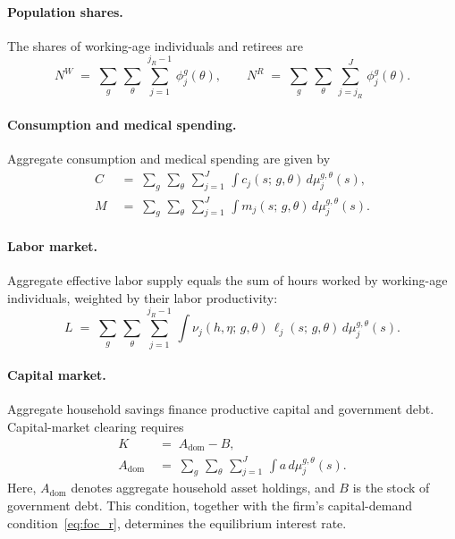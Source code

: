 \documentclass[12pt,a4paper]{article}
\begin{document}
\paragraph{Population shares.}
The shares of working-age individuals and retirees are
\begin{equation}
\label{eq:agg_NWR}
N^W \;=\; \sum_g\,\sum_\theta\, \sum_{j=1}^{j_R - 1}\, \phi_j^{g}(\theta),
\qquad
N^R \;=\; \sum_g\,\sum_\theta\, \sum_{j=j_R}^{J}\, \phi_j^{g}(\theta).
\end{equation}

\paragraph{Consumption and medical spending.}
Aggregate consumption and medical spending are given by
\begin{align}
C &\;=\; \sum_g\,\sum_\theta\, \sum_{j=1}^{J}\, \int c_j(s;\, g, \theta)\, d\mu_j^{g,\theta}(s), \label{eq:agg_C}\\
M &\;=\; \sum_g\,\sum_\theta\, \sum_{j=1}^{J}\, \int m_j(s;\, g, \theta)\, d\mu_j^{g,\theta}(s). \label{eq:agg_M}
\end{align}

\paragraph{Labor market.}
Aggregate effective labor supply equals the sum of hours worked by working-age individuals, weighted by their labor productivity:
\begin{equation}
\label{eq:labor_market}
L \;=\; \sum_g\, \sum_\theta\, \sum_{j=1}^{j_R - 1}\, \int \nu_j(h, \eta;\, g, \theta)\, \ell_j(s;\, g, \theta)\, d\mu_{j}^{g,\theta}(s).
\end{equation}

\paragraph{Capital market.}
Aggregate household savings finance productive capital and government debt. Capital-market clearing requires
\begin{align}
K &\;=\; A_{\mathrm{dom}} - B, \label{eq:capital_market}\\
A_{\mathrm{dom}} &\;=\; \sum_g\,\sum_\theta\, \sum_{j=1}^{J}\, \int a\, d\mu_j^{g,\theta}(s). \label{eq:agg_A}
\end{align}
Here, $A_{\mathrm{dom}}$ denotes aggregate household asset holdings, and $B$ is the stock of government debt. This condition, together with the firm's capital-demand condition~\eqref{eq:foc_r}, determines the equilibrium interest rate.
\end{document}
